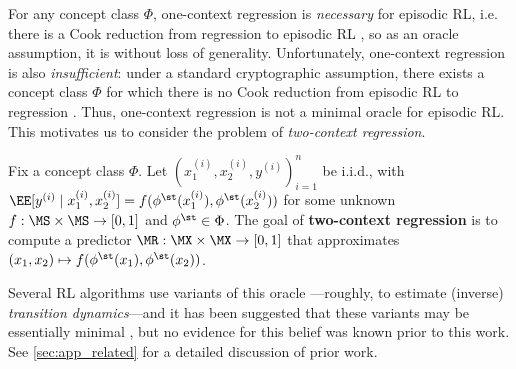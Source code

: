 For any concept class $\Phi$, one-context regression is \emph{necessary} for episodic RL, i.e. there is a Cook reduction from regression to episodic RL \citep{golowich2024exploring}, so as an oracle assumption, it is without loss of generality. Unfortunately, one-context regression is also \emph{insufficient}: under a standard cryptographic assumption, there exists a concept class $\Phi$ for which there is no Cook reduction from episodic RL to regression \citep{golowich2024exploration}. Thus, one-context regression is not a minimal oracle for episodic RL.  This motivates us to consider the problem of \emph{two-context regression}. \loose

\begin{definition}\label{def:tcr-informal}
Fix a concept class $\Phi$. Let $(x_1^{(i)},x_2^{(i)},y^{(i)})_{i=1}^n$ be i.i.d., with $\EE[y^{(i)}\mid{}x_1^{(i)},x_2^{(i)}] = f(\phi^\st(x_1^{(i)}),\phi^\st(x_2^{(i)}))$ for some unknown $f: \MS\times\MS \to [0,1]$ and $\phi^\st \in \Phi$. The goal of \textbf{two-context regression} is to compute a predictor $\MR: \MX\times\MX \to [0,1]$ that approximates $(x_1,x_2)\mapsto f(\phi^\st(x_1),\phi^\st(x_2))$.
\end{definition}

Several RL algorithms use variants of this oracle \citep{misra2020kinematic,mhammedi2023representation}---roughly, to estimate (inverse) \emph{transition dynamics}---and it has been suggested that these variants may be essentially minimal \citep{golowich2024exploration}, but no evidence for this belief was known prior to this work. See \cref{sec:app_related} for a detailed discussion of prior work. %


